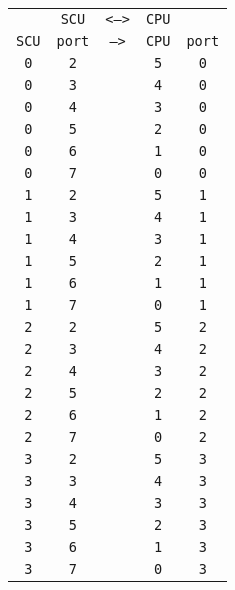\begin{adjustwidth}{5ex}{1ex}
	\begin{tabular}{ccccc}
		& \texttt{SCU} & \texttt{<-->} & \texttt{CPU} &  \\
		\texttt{SCU} & \texttt{port} & \texttt{-->} & \texttt{CPU} & \texttt{port} \\
		\texttt{0} & \texttt{2} & & \texttt{5} & \texttt{0} \\
		\texttt{0} & \texttt{3} & & \texttt{4} & \texttt{0} \\
		\texttt{0} & \texttt{4} & & \texttt{3} & \texttt{0} \\
		\texttt{0} & \texttt{5} & & \texttt{2} & \texttt{0} \\
		\texttt{0} & \texttt{6} & & \texttt{1} & \texttt{0} \\
		\texttt{0} & \texttt{7} & & \texttt{0} & \texttt{0} \\
		\texttt{1} & \texttt{2} & & \texttt{5} & \texttt{1} \\
		\texttt{1} & \texttt{3} & & \texttt{4} & \texttt{1} \\
		\texttt{1} & \texttt{4} & & \texttt{3} & \texttt{1} \\
		\texttt{1} & \texttt{5} & & \texttt{2} & \texttt{1} \\
		\texttt{1} & \texttt{6} & & \texttt{1} & \texttt{1} \\
		\texttt{1} & \texttt{7} & & \texttt{0} & \texttt{1} \\
		\texttt{2} & \texttt{2} & & \texttt{5} & \texttt{2} \\
		\texttt{2} & \texttt{3} & & \texttt{4} & \texttt{2} \\
		\texttt{2} & \texttt{4} & & \texttt{3} & \texttt{2} \\
		\texttt{2} & \texttt{5} & & \texttt{2} & \texttt{2} \\
		\texttt{2} & \texttt{6} & & \texttt{1} & \texttt{2} \\
		\texttt{2} & \texttt{7} & & \texttt{0} & \texttt{2} \\
		\texttt{3} & \texttt{2} & & \texttt{5} & \texttt{3} \\
		\texttt{3} & \texttt{3} & & \texttt{4} & \texttt{3} \\
		\texttt{3} & \texttt{4} & & \texttt{3} & \texttt{3} \\
		\texttt{3} & \texttt{5} & & \texttt{2} & \texttt{3} \\
		\texttt{3} & \texttt{6} & & \texttt{1} & \texttt{3} \\
		\texttt{3} & \texttt{7} & & \texttt{0} & \texttt{3} \\
	\end{tabular}
\end{adjustwidth}

